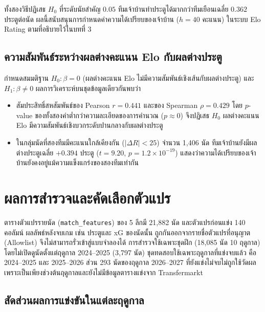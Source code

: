 ทั้งสองวิธีปฏิเสธ $H_0$ ที่ระดับนัยสำคัญ $0.05$ ทีมเจ้าบ้านทำประตูได้มากกว่าทีมเยือนเฉลี่ย $0.362$ ประตูต่อนัด ผลนี้สนับสนุนการกำหนดค่าความได้เปรียบของเจ้าบ้าน ($h = 40$ คะแนน) ในระบบ Elo Rating ตามที่อธิบายไว้ในบทที่ 3

\subsection{ความสัมพันธ์ระหว่างผลต่างคะแนน Elo กับผลต่างประตู}

กำหนดสมมติฐาน $H_0: \beta = 0$ (ผลต่างคะแนน Elo ไม่มีความสัมพันธ์เชิงเส้นกับผลต่างประตู) และ $H_1: \beta \neq 0$ ผลการวิเคราะห์บนชุดข้อมูลเดียวกันพบว่า

\begin{itemize}
    \item สัมประสิทธิ์สหสัมพันธ์ของ Pearson $r = 0.441$ และของ Spearman $\rho = 0.429$ โดย $p$-value ของทั้งสองค่าต่ำกว่าความละเอียดของการคำนวณ ($p \approx 0$) จึงปฏิเสธ $H_0$ ผลต่างคะแนน Elo มีความสัมพันธ์เชิงบวกระดับปานกลางกับผลต่างประตู
    \item ในกลุ่มนัดที่สองทีมมีคะแนนใกล้เคียงกัน ($|\Delta R| < 25$) จำนวน 1,406 นัด ทีมเจ้าบ้านยังมีผลต่างประตูเฉลี่ย $+0.394$ ประตู ($t = 9.20$, $p = 1.2 \times 10^{-19}$) แสดงว่าความได้เปรียบของเจ้าบ้านยังคงอยู่แม้ความแข็งแกร่งของสองทีมเท่ากัน
\end{itemize}

\section{ผลการสำรวจและคัดเลือกตัวแปร}

ตารางตัวแปรรายนัด (\texttt{match\_features}) ของ 5 ลีกมี 21,882 นัด และตัวแปรก่อนแข่ง 140 คอลัมน์ ผลลัพธ์หลังจบเกม เช่น ประตูและ xG ของนัดนั้น ถูกกันออกจากรายชื่อตัวแปรที่อนุญาต (Allowlist) จึงไม่สามารถรั่วเข้าสู่แบบจำลองได้ การสำรวจใช้เฉพาะชุดฝึก (18,085 นัด 10 ฤดูกาล) โดยไม่เปิดดูนัดตั้งแต่ฤดูกาล 2024--2025 (3,797 นัด) ชุดทดสอบใช้เฉพาะฤดูกาลที่แข่งจบแล้ว คือ 2024--2025 และ 2025--2026 ส่วน 293 นัดของฤดูกาล 2026--2027 ที่ยังแข่งไม่จบไม่ถูกใช้วัดผล เพราะเป็นเพียงช่วงต้นฤดูกาลและยังไม่มีข้อมูลตารางแข่งจาก Transfermarkt

\subsection{สัดส่วนผลการแข่งขันในแต่ละฤดูกาล}

